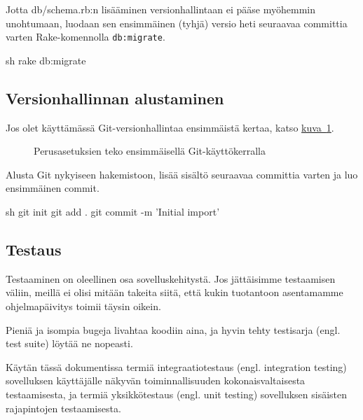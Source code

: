 \documentclass{article}
\newenvironment{myfigure}{
  \begin{figure}
    \centering
    \begin{lrbox}{\myfigurebox}
      \begin{minipage}{0.8\textwidth}
}{
      \end{minipage}
    \end{lrbox}
    \fcolorbox{blue}{blue!1}{\usebox{\myfigurebox}}
  \end{figure}
}
\newcommand{\en}[1]{\foreignlanguage{english}{#1}}
\begin{document}
\begin{samepage}
Jotta db/schema.rb:n lisääminen versionhallintaan ei pääse myöhemmin
unohtumaan, luodaan sen ensimmäinen (tyhjä) versio heti seuraavaa committia
varten Rake-komennolla {\tt db:migrate}.

\begin{pygmented}{sh}
rake db:migrate
\end{pygmented}
\end{samepage}

\subsection{Versionhallinnan alustaminen}

Jos olet käyttämässä Git-versionhallintaa ensimmäistä kertaa, katso
\hyperref[fig:git-initial-config]{kuva~\ref*{fig:git-initial-config}}.

\begin{myfigure}
\caption{Perusasetuksien teko ensimmäisellä Git-käyttökerralla}
\label{fig:git-initial-config}
\end{myfigure}

\begin{samepage}
Alusta Git nykyiseen hakemistoon, lisää sisältö seuraavaa committia varten ja
luo ensimmäinen commit.

\begin{pygmented}{sh}
git init
git add .
git commit -m 'Initial import'
\end{pygmented}
\end{samepage}

\subsection{Testaus}

Testaaminen on oleellinen osa sovelluskehitystä. Jos jättäisimme testaamisen
väliin, meillä ei olisi mitään takeita siitä, että kukin tuotantoon asentamamme
ohjelmapäivitys toimii täysin oikein.

Pieniä ja isompia bugeja livahtaa koodiin aina, ja hyvin tehty testisarja
(engl. \en{test suite}) löytää ne nopeasti.

Käytän tässä dokumentissa termiä integraatiotestaus (engl. \en{integration
testing}) sovelluksen käyttäjälle näkyvän toiminnallisuuden kokonaisvaltaisesta
testaamisesta, ja termiä yksikkötestaus (engl. \en{unit testing}) sovelluksen
sisäisten rajapintojen testaamisesta.
\end{document}
